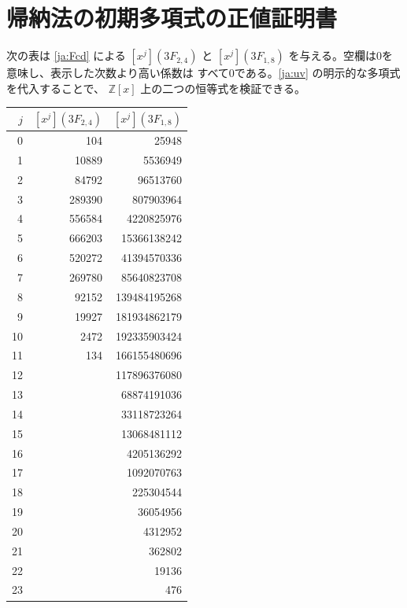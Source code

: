 \documentclass[12pt]{amsart}
\theoremstyle{definition}
\theoremstyle{remark}
\numberwithin{equation}{section}
\begin{document}
\section{帰納法の初期多項式の正値証明書}
次の表は \eqref{ja:Fcd} による $[x^j](3F_{2,4})$ と
$[x^j](3F_{1,8})$ を与える。空欄は0を意味し、表示した次数より高い係数は
すべて0である。\eqref{ja:uv} の明示的な多項式を代入することで、
$\mathbb Z[x]$ 上の二つの恒等式を検証できる。
\begin{center}\small
\begin{tabular}{r|r|r}
$j$&$[x^j](3F_{2,4})$&$[x^j](3F_{1,8})$\\\hline
0&104&25948\\
1&10889&5536949\\
2&84792&96513760\\
3&289390&807903964\\
4&556584&4220825976\\
5&666203&15366138242\\
6&520272&41394570336\\
7&269780&85640823708\\
8&92152&139484195268\\
9&19927&181934862179\\
10&2472&192335903424\\
11&134&166155480696\\
12&&117896376080\\
13&&68874191036\\
14&&33118723264\\
15&&13068481112\\
16&&4205136292\\
17&&1092070763\\
18&&225304544\\
19&&36054956\\
20&&4312952\\
21&&362802\\
22&&19136\\
23&&476
\end{tabular}
\end{center}
\end{document}
